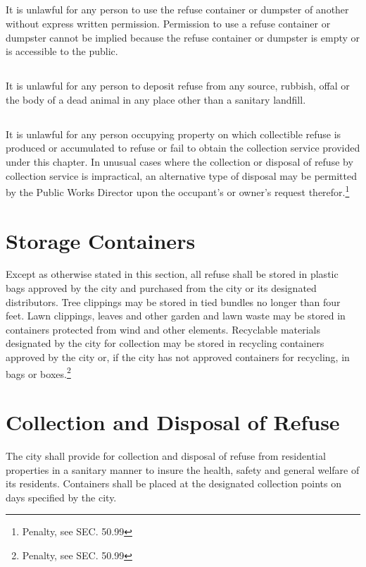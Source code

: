 \subsection{}
It is unlawful for any person to use the refuse container or dumpster of another without express written permission.  Permission to use a refuse container or dumpster cannot be implied because the refuse container or dumpster is empty or is accessible to the public.
\subsection{}
It is unlawful for any person to deposit refuse from any source, rubbish, offal or the body of a dead animal in any place other than a sanitary landfill.
\subsection{}
It is unlawful for any person occupying property on which collectible refuse is produced or accumulated to refuse or fail to obtain the collection service provided under this chapter.  In unusual cases where the collection or disposal of refuse by collection service is impractical, an alternative type of disposal may be permitted by the Public Works Director upon the occupant’s or owner’s request therefor.\footnote{Penalty, see SEC. 50.99}

\section{Storage Containers}
Except as otherwise stated in this section, all refuse shall be stored in plastic bags approved by the city and purchased from the city or its designated distributors.  Tree clippings may be stored in tied bundles no longer than four feet.  Lawn clippings, leaves and other garden and lawn waste may be stored in containers protected from wind and other elements.  Recyclable materials designated by the city for collection may be stored in recycling containers approved by the city or, if the city has not approved containers for recycling, in bags or boxes.\footnote{Penalty, see SEC. 50.99}

\section{Collection and Disposal of Refuse}
The city shall provide for collection and disposal of refuse from residential properties in a sanitary manner to insure the health, safety and general welfare of its residents.  Containers shall be placed at the designated collection points on days specified by the city.

